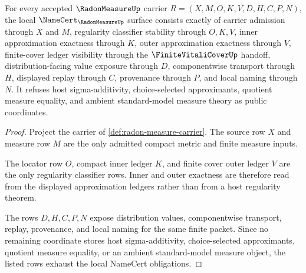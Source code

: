 \begin{theorem}
\label{thm:radon-measure-namecert-obligations}
For every accepted $\RadonMeasureUp$ carrier $R=(X,M,O,K,V,D,H,C,P,N)$, the local $\NameCert_{\RadonMeasureUp}$ surface consists exactly of carrier admission through $X$ and $M$, regularity classifier stability through $O,K,V$, inner approximation exactness through $K$, outer approximation exactness through $V$, finite-cover ledger visibility through the $\FiniteVitaliCoverUp$ handoff, distribution-facing value exposure through $D$, componentwise transport through $H$, displayed replay through $C$, provenance through $P$, and local naming through $N$. It refuses host sigma-additivity, choice-selected approximants, quotient measure equality, and ambient standard-model measure theory as public coordinates.
\end{theorem}
\begin{proof}
Project the carrier of \autoref{def:radon-measure-carrier}. The source row $X$ and measure row $M$ are the only admitted compact metric and finite measure inputs.

The locator row $O$, compact inner ledger $K$, and finite cover outer ledger $V$ are the only regularity classifier rows. Inner and outer exactness are therefore read from the displayed approximation ledgers rather than from a host regularity theorem.

The rows $D,H,C,P,N$ expose distribution values, componentwise transport, replay, provenance, and local naming for the same finite packet. Since no remaining coordinate stores host sigma-additivity, choice-selected approximants, quotient measure equality, or an ambient standard-model measure object, the listed rows exhaust the local NameCert obligations.
\end{proof}

